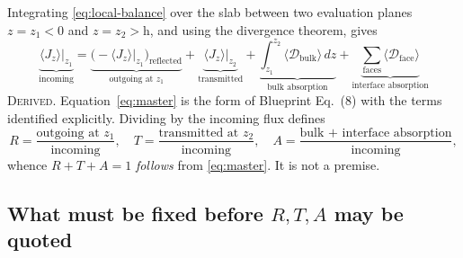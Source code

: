 \documentclass[11pt]{article}
\theoremstyle{plain}
\begin{document}
Integrating \eqref{eq:local-balance} over the slab between two evaluation planes
$z=z_1<0$ and $z=z_2>\mathrm{h}$, and using the divergence theorem, gives
\begin{equation}
  \boxed{
  \underbrace{\langle J_z\rangle\big|_{z_1}}_{\text{incoming}}
  = \underbrace{\big(-\langle J_z\rangle\big|_{z_1}\big)_{\text{reflected}}}_{\text{outgoing at }z_1}
  + \underbrace{\langle J_z\rangle\big|_{z_2}}_{\text{transmitted}}
  + \underbrace{\int_{z_1}^{z_2}\langle\mathcal{D}_{\text{bulk}}\rangle\,dz}_{\text{bulk absorption}}
  + \underbrace{\sum_{\text{faces}}\langle\mathcal{D}_{\text{face}}\rangle}_{\text{interface absorption}}
  }
  \label{eq:master}
\end{equation}
\textsc{Derived}. Equation~\eqref{eq:master} is the form of Blueprint Eq.~(8) with
the terms identified explicitly. Dividing by the incoming flux defines
\begin{equation}
  R = \frac{\text{outgoing at }z_1}{\text{incoming}},\quad
  T = \frac{\text{transmitted at }z_2}{\text{incoming}},\quad
  A = \frac{\text{bulk + interface absorption}}{\text{incoming}},
  \label{eq:RTA}
\end{equation}
whence $R+T+A=1$ \emph{follows} from \eqref{eq:master}. It is not a premise.

\subsection{What must be fixed before $R,T,A$ may be quoted}
\end{document}
